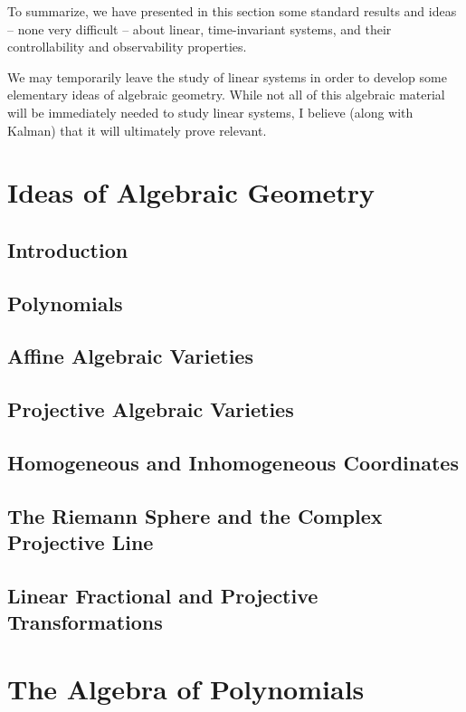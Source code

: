 \documentclass[12pt]{book}
\theoremstyle{plain}
\theoremstyle{definition}
\begin{document}
To summarize, we have presented in this section some standard results and ideas -- none very difficult -- about linear, time-invariant systems, and their controllability and observability properties.

We may temporarily leave the study of linear systems in order to develop some elementary ideas of algebraic geometry.
While not all of this algebraic material will be immediately needed to study linear systems, I believe (along with Kalman) that it will ultimately prove relevant.

\chapter{Ideas of Algebraic Geometry}

\section{Introduction}

\section{Polynomials}

\section{Affine Algebraic Varieties}

\section{Projective Algebraic Varieties}

\section{Homogeneous and Inhomogeneous Coordinates}

\section{The Riemann Sphere and the Complex Projective Line}

\section{Linear Fractional and Projective Transformations}

\chapter{The Algebra of Polynomials}
\end{document}
